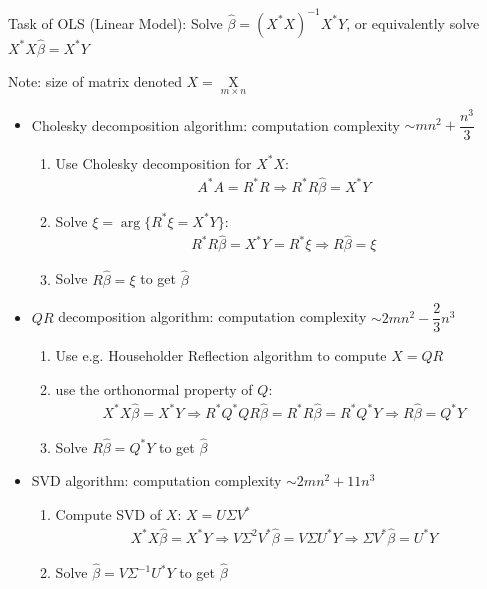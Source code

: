 

\begin{point}
    Task of OLS (Linear Model): Solve $ \hat{\beta }=(X^*X)^{-1}X^*Y $, or equivalently solve $ X^*X\hat{\beta }=X^*Y $
\end{point}

    Note: size of matrix denoted $ X=\mathop{X}\limits_{m\times n}  $
\begin{itemize}[topsep=2pt,itemsep=0pt]
    \item Cholesky decomposition algorithm: computation complexity $ \sim mn^2+\dfrac{n^3}{3} $
    \begin{enumerate}[topsep=2pt,itemsep=2pt]
        \item Use Cholesky decomposition for $ X^*X $:
        \begin{align}
            A^*A=R^*R\Rightarrow R^*R\hat{\beta }=X^*Y 
        \end{align}
        \item Solve $ \xi =\arg\{ R^*\xi =X^*Y \} $:
        \begin{align}
            R^*R\hat{\beta }=X^*Y=R^*\xi \Rightarrow R\hat{\beta }=\xi  
        \end{align}
        \item Solve $ R\hat{\beta }=\xi  $ to get $ \hat{\beta } $
    \end{enumerate}
    \item $ QR $ decomposition algorithm: computation complexity $ \sim 2mn^2-\dfrac{2}{3}n^3 $
    \begin{enumerate}[topsep=2pt,itemsep=2pt]
        \item Use e.g. Householder Reflection algorithm to compute $ X=QR $
        \item use the orthonormal property of $ Q $:
        \begin{align}
            X^*X\hat{\beta }=X^*Y\Rightarrow R^*Q^*QR\hat{\beta }=R^*R\hat{\beta }=R^*Q^*Y\Rightarrow R\hat{\beta }=Q^*Y 
        \end{align}
        \item Solve $ R\hat{\beta }=Q^*Y $ to get $ \hat{\beta } $
    \end{enumerate}
    \item SVD algorithm: computation complexity $ \sim 2mn^2+11n^3 $
    \begin{enumerate}[topsep=2pt,itemsep=2pt]
        \item Compute SVD of $ X $: $ X=U\Sigma V^* $
        \begin{align}
             X^*X\hat{\beta }=X^*Y\Rightarrow V\Sigma ^2V^*\hat{\beta }=V\Sigma U^*Y\Rightarrow \Sigma V^*\hat{\beta }=U^*Y
        \end{align}
        \item Solve $ \hat{\beta }=V\Sigma ^{-1}U^*Y $ to get $ \hat{\beta } $
    \end{enumerate}
    
\end{itemize}
    
